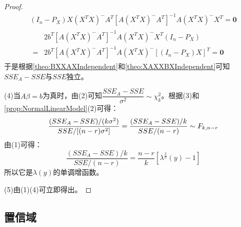 \begin{proof}
\begin{gather*}
		(I_n-P_X)X(X^TX)^-A^T[A(X^TX)^-A^T]^{-1}A(X^TX)^-X^T=\mathbf{0} \\
		\begin{aligned}
			&2b^T[A(X^TX)^-A^T]^{-1}A(X^TX)^-X^T(I_n-P_X) \\
			=&2b^T[A(X^TX)^-A^T]^{-1}A(X^TX)^-[(I_n-P_X)X]^T=\mathbf{0}
		\end{aligned}
	\end{gather*}
	于是根据\cref{theo:BXXAXIndependent}和\cref{theo:XAXXBXIndependent}可知$SSE_A-SSE$与$SSE$独立。\par
	(4)当$A\beta=b$为真时，由(2)可知$\dfrac{SSE_A-SSE}{\sigma^2}\sim\chi^2_{k}$。根据(3)和\cref{prop:NormalLinearModel}(2)可得：
	\begin{equation*}
		\frac{(SSE_A-SSE)/(k\sigma^2)}{SSE/[(n-r)\sigma^2]}=\frac{(SSE_A-SSE)/k}{SSE/(n-r)}\sim F_{k,n-r}\qedhere
	\end{equation*}
	由(1)可得：
	\begin{equation*}
		\frac{(SSE_A-SSE)/k}{SSE/(n-r)}=\frac{n-r}{k}[\lambda^{\frac{2}{n}}(y)-1]
	\end{equation*}
	所以它是$\lambda(y)$的单调增函数。\par
	(5)由(1)(4)可立即得出。
\end{proof}

\subsection{置信域}
